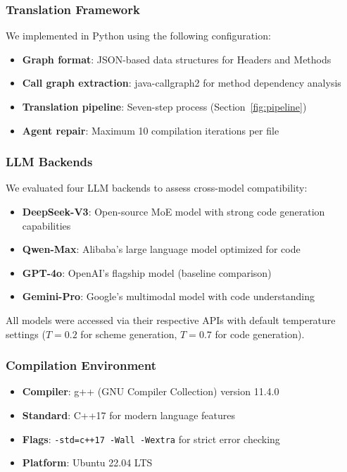 \subsubsection{Translation Framework}

We implemented \tool{} in Python using the following configuration:
\begin{itemize}
\item \textbf{Graph format}: JSON-based data structures for Headers and Methods
\item \textbf{Call graph extraction}: java-callgraph2 for method dependency analysis
\item \textbf{Translation pipeline}: Seven-step process (Section~\ref{fig:pipeline})
\item \textbf{Agent repair}: Maximum 10 compilation iterations per file
\end{itemize}

\subsubsection{LLM Backends}

We evaluated four LLM backends to assess cross-model compatibility:
\begin{itemize}
\item \textbf{DeepSeek-V3}: Open-source MoE model with strong code generation capabilities
\item \textbf{Qwen-Max}: Alibaba's large language model optimized for code
\item \textbf{GPT-4o}: OpenAI's flagship model (baseline comparison)
\item \textbf{Gemini-Pro}: Google's multimodal model with code understanding
\end{itemize}

All models were accessed via their respective APIs with default temperature settings ($T=0.2$ for scheme generation, $T=0.7$ for code generation).

\subsubsection{Compilation Environment}

\begin{itemize}
\item \textbf{Compiler}: g++ (GNU Compiler Collection) version 11.4.0
\item \textbf{Standard}: C++17 for modern language features
\item \textbf{Flags}: \texttt{-std=c++17 -Wall -Wextra} for strict error checking
\item \textbf{Platform}: Ubuntu 22.04 LTS
\end{itemize}

